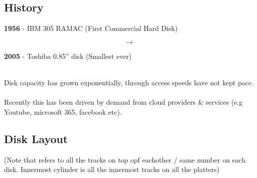 \documentclass{report}
\begin{document}
        \subsection*{History}
            \begin{minipage}[t]{0.4\textwidth}
                \textbf{1956} - IBM 305 RAMAC (First Commercial Hard Disk)
            \end{minipage}
            \begin{minipage}[t]{0.2\textwidth}
                \begin{huge}
                    \[\to\]
                \end{huge}
            \end{minipage}
            \begin{minipage}[t]{0.4\textwidth}
                \textbf{2005} - Toshiba 0.85'' disk (Smallest ever)
            \end{minipage}
            \\ Disk capacity has grown exponentially, through access speeds have not kept pace.
            \\
            \\ Recently this has been driven by demand from cloud providers \& services (e.g Youtube, microsoft 365, facebook etc).
            \\
        
        \subsection*{Disk Layout}
            \begin{minipage}[t]{0.6\textwidth}
                (Note that  refers to all the tracks on top opf eachother / same number on each disk. Innermost cylinder is all the innermost tracks on all the platters)
            \end{minipage}
            \begin{minipage}[t]{0.4\textwidth}
            \end{minipage}
        
\end{document}
